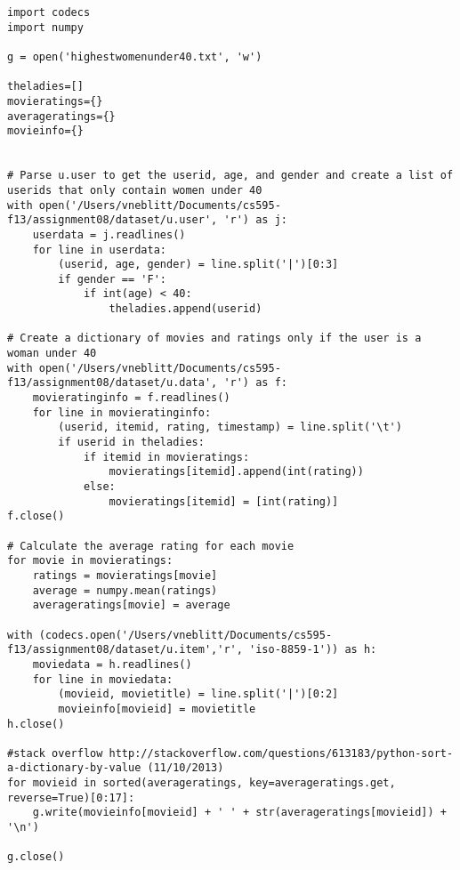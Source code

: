 \documentclass{article}
\begin{document}
\begin{lstlisting}[frame=single, caption=highestwomenunder40.py, label=highwomenunder40]
import codecs
import numpy

g = open('highestwomenunder40.txt', 'w')

theladies=[]
movieratings={}
averageratings={}
movieinfo={}


# Parse u.user to get the userid, age, and gender and create a list of userids that only contain women under 40
with open('/Users/vneblitt/Documents/cs595-f13/assignment08/dataset/u.user', 'r') as j:
	userdata = j.readlines()
	for line in userdata:
		(userid, age, gender) = line.split('|')[0:3]
		if gender == 'F':
			if int(age) < 40:
				theladies.append(userid)

# Create a dictionary of movies and ratings only if the user is a woman under 40
with open('/Users/vneblitt/Documents/cs595-f13/assignment08/dataset/u.data', 'r') as f:
	movieratinginfo = f.readlines()
	for line in movieratinginfo:
		(userid, itemid, rating, timestamp) = line.split('\t')
		if userid in theladies:
			if itemid in movieratings:
				movieratings[itemid].append(int(rating))
			else:
				movieratings[itemid] = [int(rating)]
f.close()

# Calculate the average rating for each movie
for movie in movieratings:
	ratings = movieratings[movie]
	average = numpy.mean(ratings)
	averageratings[movie] = average

with (codecs.open('/Users/vneblitt/Documents/cs595-f13/assignment08/dataset/u.item','r', 'iso-8859-1')) as h:
	moviedata = h.readlines()
	for line in moviedata:
		(movieid, movietitle) = line.split('|')[0:2]
		movieinfo[movieid] = movietitle
h.close()

#stack overflow http://stackoverflow.com/questions/613183/python-sort-a-dictionary-by-value (11/10/2013)
for movieid in sorted(averageratings, key=averageratings.get, reverse=True)[0:17]:
	g.write(movieinfo[movieid] + ' ' + str(averageratings[movieid]) + '\n')

g.close()
\end{lstlisting}

\newpage



\end{document}
